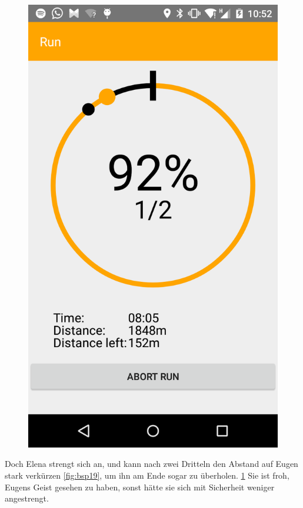 \begin{figure}
\begin{minipage}{.4\textwidth}
  \includegraphics[width=.8\linewidth]{abb/bsp/bsp20}
  \label{fig:bsp20}
\end{minipage}
\end{figure}

Doch Elena strengt sich an, und kann nach zwei Dritteln den Abstand auf Eugen stark verkürzen \ref{fig:bsp19}, um ihn am Ende sogar zu überholen. \ref{fig:bsp20} Sie ist froh, Eugens Geist gesehen zu haben, sonst hätte sie sich mit Sicherheit weniger angestrengt.

